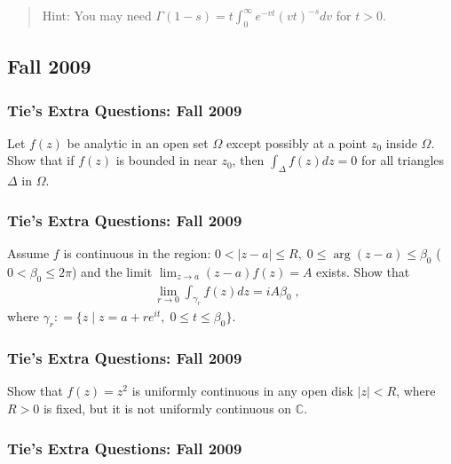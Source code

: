 \begin{quote}
Hint: You may need
\(\displaystyle{\Gamma(1-s)=t \int_0^{\infty}e^{-vt}(vt)^{-s} dv}\) for
\(t>0\).
\end{quote}

\hypertarget{fall-2009}{%
\subsection{Fall 2009}\label{fall-2009}}

\hypertarget{ties-extra-questions-fall-2009-13}{%
\subsubsection{Tie's Extra Questions: Fall
2009}\label{ties-extra-questions-fall-2009-13}}

Let \(f(z)\) be analytic in an open set \(\Omega\) except possibly at a
point \(z_0\) inside \(\Omega\). Show that if \(f(z)\) is bounded in
near \(z_0\), then \(\displaystyle \int_\Delta f(z) dz = 0\) for all
triangles \(\Delta\) in \(\Omega\).

\hypertarget{ties-extra-questions-fall-2009-14}{%
\subsubsection{Tie's Extra Questions: Fall
2009}\label{ties-extra-questions-fall-2009-14}}

Assume \(f\) is continuous in the region:
\(0< |z-a| \leq R, \; 0 \leq \arg(z-a) \leq \beta_0\)
(\(0 < \beta_0 \leq 2 \pi\)) and the limit
\(\displaystyle \lim_{z \rightarrow a} (z-a) f(z) = A\) exists. Show
that
\begin{align*}\lim_{r \rightarrow 0} \int_{\gamma_r} f(z) dz  = i A \beta_0 \; , \; \;\end{align*}
where
\(\gamma_r : = \{ z \; | \; z = a + r e^{it}, \; 0 \leq t \leq \beta_0 \}.\)

\hypertarget{ties-extra-questions-fall-2009-15}{%
\subsubsection{Tie's Extra Questions: Fall
2009}\label{ties-extra-questions-fall-2009-15}}

Show that \(f(z) = z^2\) is uniformly continuous in any open disk
\(|z| < R\), where \(R>0\) is fixed, but it is not uniformly continuous
on \(\mathbb C\).

\hypertarget{ties-extra-questions-fall-2009-16}{%
\subsubsection{Tie's Extra Questions: Fall
2009}\label{ties-extra-questions-fall-2009-16}}

